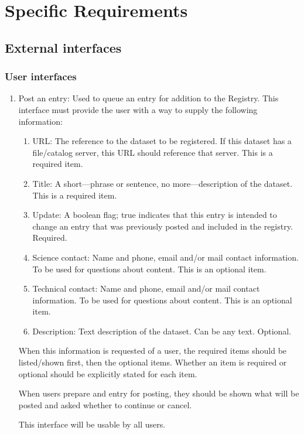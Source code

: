 \documentclass{article}
\begin{document}
\section{Specific Requirements}

\subsection{External interfaces}
\subsubsection{User interfaces}
\begin{enumerate}
\item Post an entry: Used to queue an entry for addition to the Registry.
  This interface must provide the user with a way to supply the following
  information:
  \begin{enumerate}
  \item URL: The reference to the dataset to be registered. If this dataset
    has a file/catalog server, this URL should reference that server. This
    is a required item.
  \item Title: A short---phrase or sentence, no more---description of the
    dataset. This is a required item.
  \item Update: A boolean flag; true indicates that this entry is intended
    to change an entry that was previously posted and included in the
    registry. Required.
  \item Science contact: Name and phone, email and/or mail contact
    information. To be used for questions about content. This is an
    optional item.
  \item Technical contact: Name and phone, email and/or mail contact
    information. To be used for questions about content. This is an
    optional item.
  \item Description: Text description of the dataset. Can be any text.
    Optional.
  \end{enumerate}
  When this information is requested of a user, the required items should be
  listed/shown first, then the optional items. Whether an item is required
  or optional should be explicitly stated for each item.

  When users prepare and entry for posting, they should be shown what will be
  posted and asked whether to continue or cancel.

  This interface will be usable by all users.


\end{enumerate}
\end{document}

